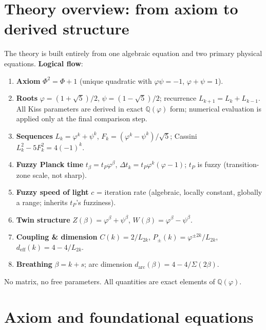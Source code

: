 \documentclass[12pt,a4paper]{article}
\begin{document}
\section*{Theory overview: from axiom to derived structure}
\label{sec:theory-overview}
\noindent The theory is built entirely from one algebraic equation and two primary physical equations. \textbf{Logical flow}:
\begin{enumerate}[nosep]
\item \textbf{Axiom} $\Phi^2 = \Phi + 1$ (unique quadratic with $\varphi\psi = -1$, $\varphi + \psi = 1$).
\item \textbf{Roots} $\varphi = (1+\sqrt{5})/2$, $\psi = (1-\sqrt{5})/2$; recurrence $L_{k+1} = L_k + L_{k-1}$. All Kiss parameters are derived in exact $\mathbb{Q}(\varphi)$ form; numerical evaluation is applied only at the final comparison step.
\item \textbf{Sequences} $L_k = \varphi^k + \psi^k$, $F_k = (\varphi^k - \psi^k)/\sqrt{5}$; Cassini $L_k^2 - 5F_k^2 = 4(-1)^k$.
\item \textbf{Fuzzy Planck time} $t_\beta = t_P\varphi^\beta$, $\Delta t_k = t_P\varphi^k(\varphi-1)$; $t_P$ is fuzzy (transition-zone scale, not sharp).
\item \textbf{Fuzzy speed of light} $c$ = iteration rate (algebraic, locally constant, globally a range; inherits $t_P$'s fuzziness).
\item \textbf{Twin structure} $Z(\beta) = \varphi^\beta + \psi^\beta$, $W(\beta) = \varphi^\beta - \psi^\beta$.
\item \textbf{Coupling \& dimension} $C(k) = 2/L_{2k}$, $P_\pm(k) = \varphi^{\pm 2k}/L_{2k}$, $d_{\mathrm{eff}}(k) = 4 - 4/L_{2k}$.
\item \textbf{Breathing} $\beta = k + s$; arc dimension $d_{\mathrm{arc}}(\beta) = 4 - 4/\Sigma(2\beta)$.
\end{enumerate}
\noindent No matrix, no free parameters. All quantities are exact elements of $\mathbb{Q}(\varphi)$.


\section{Axiom and foundational equations}
\label{sec:axiom}
\label{sec:axiom-and-T}
\label{sec:trunk-axiom}
\label{sec:trunk-vortex}
\end{document}
